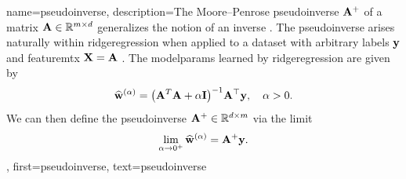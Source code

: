  
 
{name={pseudoinverse},
  description={The Moore–Penrose pseudoinverse ${\bf A}^{+}$ 
 of a matrix ${\bf A} \in \mathbb{R}^{m \times d}$ generalizes the 
 notion of an \gls{inverse} \cite{GolubVanLoanBook}. The pseudoinverse arises naturally 
 within \gls{ridgeregression} when applied to a \gls{dataset} with arbitrary \glspl{label} ${\bf y}$ 
 and \gls{featuremtx} ${\bf X} = {\bf A}$ \cite[Ch.\ 3]{hastie01statisticallearning}. The \gls{modelparams} 
 learned by \gls{ridgeregression} 
  are given by
  	\[
  	\widehat{{\bf w}}^{(\alpha)}  = \big({\bf A}^T {\bf A} + \alpha \mathbf{I} \big)^{-1} {\bf A}^\top {\bf y}, \quad \alpha > 0.
  	\]
  	We can then define the pseudoinverse  ${\bf A}^+ \in \mathbb{R}^{d \times m}$ via 
  	the limit \cite[Ch. 3]{benisrael2003generalized}
  	\[
  	\lim_{\alpha \to 0^+} \widehat{{\bf w}}^{(\alpha)} = {\bf A}^+ {\bf y}.
  	\]
	},
 	first={pseudoinverse},
 	text={pseudoinverse}
 }
 

